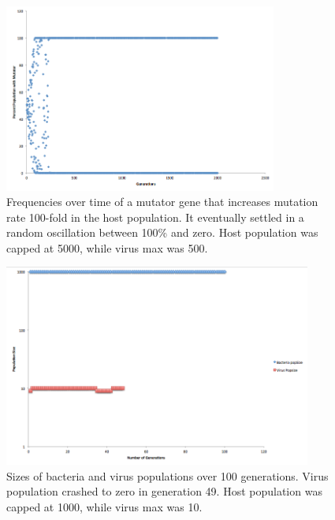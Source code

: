 \documentclass[11pt, oneside]{article}
\begin{document}
\begin{figure}[H]
	\centering
	\includegraphics[width=0.8\textwidth]{figure3.png}
	\caption{Frequencies over time of a mutator gene that increases mutation rate 100-fold in the host population. It eventually settled in a random oscillation between 100\% and zero. Host population was capped at 5000, while virus max was 500.}
\end{figure}

\begin{figure}[H]
	\centering
	\includegraphics[width=0.9\textwidth]{figure4.png}
	\caption{Sizes of bacteria and virus populations over 100 generations. Virus population crashed to zero in generation 49. Host population was capped at 1000, while virus max was 10.}
\end{figure}
\end{document}
